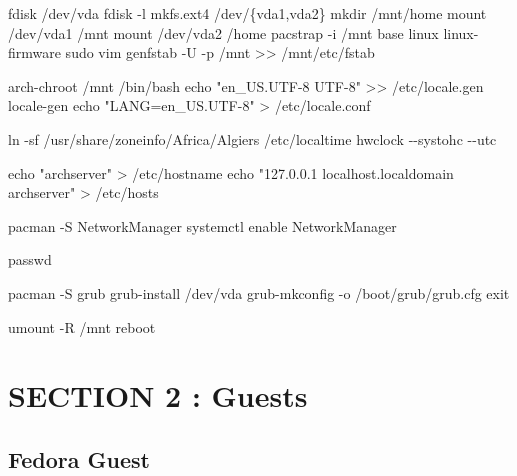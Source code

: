 \documentclass[
  14pt,
  english,
  a4paper,
]{scrreprt}
\newenvironment{Shaded}{}{}
\newcommand{\BuiltInTok}[1]{#1}
\newcommand{\DataTypeTok}[1]{\textcolor[rgb]{0.56,0.13,0.00}{#1}}
\newcommand{\ExtensionTok}[1]{#1}
\newcommand{\FunctionTok}[1]{\textcolor[rgb]{0.02,0.16,0.49}{#1}}
\newcommand{\NormalTok}[1]{#1}
\newcommand{\OperatorTok}[1]{\textcolor[rgb]{0.40,0.40,0.40}{#1}}
\newcommand{\StringTok}[1]{\textcolor[rgb]{0.25,0.44,0.63}{#1}}
\begin{document}
\begin{Shaded}
\begin{Highlighting}[]

\ExtensionTok{fdisk}\NormalTok{ /dev/vda}
\ExtensionTok{fdisk}\NormalTok{ {-}l}
\ExtensionTok{mkfs.ext4}\NormalTok{ /dev/}\DataTypeTok{\{vda1,vda2\}}
\FunctionTok{mkdir}\NormalTok{ /mnt/home}
\FunctionTok{mount}\NormalTok{ /dev/vda1 /mnt}
\FunctionTok{mount}\NormalTok{ /dev/vda2 /home}
\ExtensionTok{pacstrap}\NormalTok{ {-}i /mnt base linux linux{-}firmware sudo vim}
\ExtensionTok{genfstab}\NormalTok{ {-}U {-}p /mnt }\OperatorTok{\textgreater{}\textgreater{}}\NormalTok{ /mnt/etc/fstab}

\ExtensionTok{arch{-}chroot}\NormalTok{ /mnt /bin/bash}
\BuiltInTok{echo} \StringTok{"en\_US.UTF{-}8 UTF{-}8"} \OperatorTok{\textgreater{}\textgreater{}}\NormalTok{ /etc/locale.gen}
\ExtensionTok{locale{-}gen}
\BuiltInTok{echo} \StringTok{"LANG=en\_US.UTF{-}8"} \OperatorTok{\textgreater{}}\NormalTok{ /etc/locale.conf}

\FunctionTok{ln}\NormalTok{ {-}sf /usr/share/zoneinfo/Africa/Algiers /etc/localtime}
\ExtensionTok{hwclock}\NormalTok{ {-}{-}systohc {-}{-}utc}

\BuiltInTok{echo} \StringTok{"archserver"} \OperatorTok{\textgreater{}}\NormalTok{ /etc/hostname}
\BuiltInTok{echo} \StringTok{"127.0.0.1 localhost.localdomain archserver"} \OperatorTok{\textgreater{}}\NormalTok{ /etc/hosts}

\ExtensionTok{pacman}\NormalTok{ {-}S NetworkManager}
\ExtensionTok{systemctl}\NormalTok{ enable NetworkManager}

\FunctionTok{passwd}

\ExtensionTok{pacman}\NormalTok{ {-}S grub}
\ExtensionTok{grub{-}install}\NormalTok{ /dev/vda}
\ExtensionTok{grub{-}mkconfig}\NormalTok{ {-}o /boot/grub/grub.cfg}
\BuiltInTok{exit}

\FunctionTok{umount}\NormalTok{ {-}R /mnt}
\ExtensionTok{reboot}
\end{Highlighting}
\end{Shaded}

\hypertarget{sec:guests}{%
\section{SECTION 2 : Guests}\label{sec:guests}}

\hypertarget{fedora-guest-1}{%
\subsection{Fedora Guest}\label{fedora-guest-1}}
\end{document}
